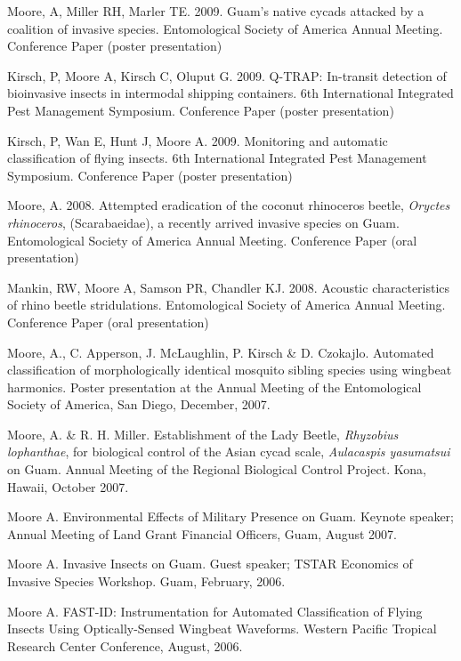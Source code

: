 \documentclass[12pt,english]{simplecv}
\begin{document}
\begin{thebibliography}{999}
Moore, A, Miller RH, Marler TE. 2009. Guam's native
cycads attacked by a coalition of invasive species. Entomological
Society of America Annual Meeting. Conference Paper (poster presentation)

Kirsch, P, Moore A, Kirsch C, Oluput G. 2009. Q-TRAP:
In-transit detection of bioinvasive insects in intermodal shipping
containers. 6th International Integrated Pest Management Symposium.
Conference Paper (poster presentation)

Kirsch, P, Wan E, Hunt J, Moore A. 2009. Monitoring
and automatic classification of flying insects. 6th International
Integrated Pest Management Symposium. Conference Paper (poster presentation)

Moore, A. 2008. Attempted eradication of the coconut
rhinoceros beetle, \emph{Oryctes rhinoceros}, (Scarabaeidae), a recently
arrived invasive species on Guam. Entomological Society of America
Annual Meeting. Conference Paper (oral presentation)

Mankin, RW, Moore A, Samson PR, Chandler KJ. 2008. Acoustic
characteristics of rhino beetle stridulations. Entomological Society
of America Annual Meeting. Conference Paper (oral presentation)

Moore, A., C. Apperson, J. McLaughlin, P. Kirsch \&
D. Czokajlo. Automated classification of morphologically identical
mosquito sibling species using wingbeat harmonics. Poster presentation
at the Annual Meeting of the Entomological Society of America, San
Diego, December, 2007.

Moore, A. \& R. H. Miller. Establishment of the Lady
Beetle, \emph{Rhyzobius lophanthae}, for biological control of the
Asian cycad scale, \emph{Aulacaspis yasumatsui} on Guam. Annual Meeting
of the Regional Biological Control Project. Kona, Hawaii, October
2007.

Moore A. Environmental Effects of Military Presence
on Guam. Keynote speaker; Annual Meeting of Land Grant Financial Officers,
Guam, August 2007.

Moore A. Invasive Insects on Guam. Guest speaker;
TSTAR Economics of Invasive Species Workshop. Guam, February, 2006.

Moore A. FAST-ID: Instrumentation for Automated Classification
of Flying Insects Using Optically-Sensed Wingbeat Waveforms. Western
Pacific Tropical Research Center Conference, August, 2006.


\end{thebibliography}
\end{document}
